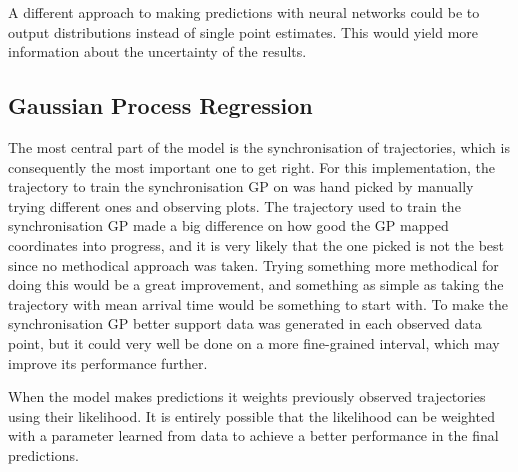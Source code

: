 A different approach to making predictions with neural networks could be to output distributions instead of single point estimates. This would yield more information about the uncertainty of the results.

\subsection{Gaussian Process Regression}
The most central part of the model is the synchronisation of trajectories, which is consequently the most important one to get right. For this implementation, the trajectory to train the synchronisation GP on was hand picked by manually trying different ones and observing plots. The trajectory used to train the synchronisation GP made a big difference on how good the GP mapped coordinates into progress, and it is very likely that the one picked is not the best since no methodical approach was taken. Trying something more methodical for doing this would be a great improvement, and something as simple as taking the trajectory with mean arrival time would be something to start with. To make the synchronisation GP better support data was generated in each observed data point, but it could very well be done on a more fine-grained interval, which may improve its performance further.

When the model makes predictions it weights previously observed trajectories using their likelihood. It is entirely possible that the likelihood can be weighted with a parameter learned from data to achieve a better performance in the final predictions.


